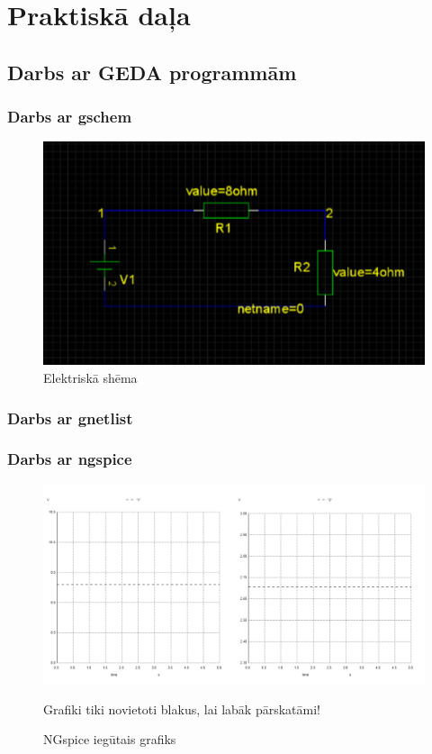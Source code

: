 \documentclass{report}
\begin{document}
\chapter{Praktiskā daļa}
\section{Darbs ar GEDA programmām}
\subsection{Darbs ar gschem}

\begin{figure}[h]
\includegraphics[width=\textwidth]{shnr1.png}
\caption{Elektriskā shēma}
\label{2}
\end{figure}
\newpage
\subsection{Darbs ar gnetlist}


\subsection{Darbs ar ngspice}
\begin{figure}[h]
\includegraphics[width=\textwidth]{divigraf.png}
\caption{NGspice iegūtais grafiks}
\vspace{10mm}
Grafiki tiki novietoti blakus, lai labāk pārskatāmi!
\label{fig:011.ps}

\end{figure}
\end{document}
